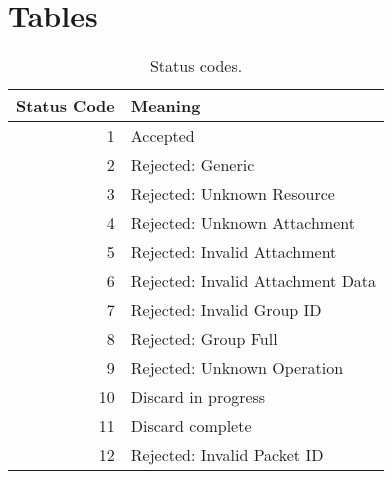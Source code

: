 \documentclass{article}
\begin{document}
\FloatBarrier{}
\clearpage

\appendix
\section{Tables}

\FloatBarrier{}

\begin{table}[h]
    \centering
    \begin{tabular}{r|l}
        Status Code & Meaning \\
        \hline
        1 & Accepted \\
        2 & Rejected: Generic \\
        3 & Rejected: Unknown Resource \\
        4 & Rejected: Unknown Attachment \\
        5 & Rejected: Invalid Attachment \\
        6 & Rejected: Invalid Attachment Data \\
        7 & Rejected: Invalid Group ID \\
        8 & Rejected: Group Full \\
        9 & Rejected: Unknown Operation \\
        10 & Discard in progress \\
        11 & Discard complete \\
        12 & Rejected: Invalid Packet ID
    \end{tabular}
    \caption{Status codes.}
    \label{tab:status-codes}
\end{table}

\FloatBarrier{}
\clearpage

\printnoidxglossaries{}
\end{document}
